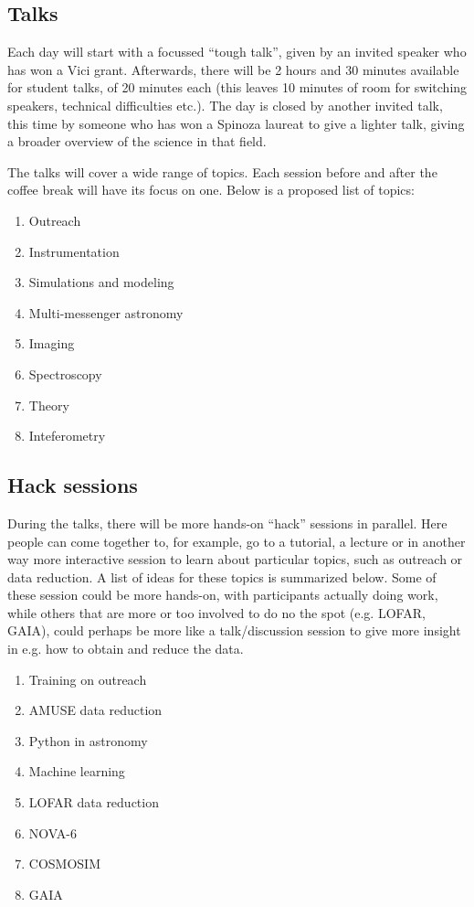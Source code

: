 \documentclass{article}
\begin{document}
\subsection{Talks}
Each day will start with a focussed ``tough talk'', given by an invited speaker who has won a Vici grant. Afterwards, there will be 2 hours and 30 minutes available for student talks, of 20 minutes each (this leaves 10 minutes of room for switching speakers, technical difficulties etc.). The day is closed by another invited talk, this time by someone who has won a Spinoza laureat to give a lighter talk, giving a broader overview of the science in that field.

The talks will cover a wide range of topics. Each session before and after the coffee break will have its focus on one. Below is a proposed list of topics:
\begin{multicols}{2}
    \begin{enumerate}
        \item Outreach
        \item Instrumentation
        \item Simulations and modeling
        \item Multi-messenger astronomy
        \item Imaging
        \item Spectroscopy
        \item Theory
        \item Inteferometry
    \end{enumerate}
\end{multicols}

\subsection{Hack sessions}
During the talks, there will be more hands-on ``hack'' sessions in parallel. Here people can come together to, for example, go to a tutorial, a lecture or in another way more interactive session to learn about particular topics, such as outreach or data reduction. A list of ideas for these topics is summarized below. Some of these session could be more hands-on, with participants actually doing work, while others that are more or too involved to do no the spot (e.g. LOFAR, GAIA), could perhaps be more like a talk/discussion session to give more insight in e.g. how to obtain and reduce the data.

\begin{multicols}{2}
    \begin{enumerate}
        \item Training on outreach
        \item AMUSE data reduction
        \item Python in astronomy
        \item Machine learning
        \item LOFAR data reduction
        \item NOVA-6
        \item COSMOSIM
        \item GAIA
    \end{enumerate}
\end{multicols}
\end{document}
